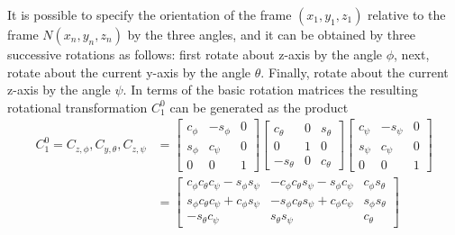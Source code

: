  It is possible to specify the orientation of the frame $(x_1,y_1,z_1)$ relative to the frame $N(x_n,y_n,z_n)$ by the three angles, and it can be obtained by three successive rotations as follows: first rotate about z-axis by the angle $\phi$, next, rotate about the current y-axis by the angle $\theta$. Finally, rotate about the current z-axis by the angle $\psi$.
 In terms of the basic rotation matrices the resulting rotational transformation $C_1^0$ can be generated as the product
 \begin{equation}\label{euler}
 \begin{split}
 C_1^0=C_{z,\phi},C_{y,\theta},C_{z,\psi} &= \left[\begin{array}{ccc}
                                                      c_\phi & -s_\phi & 0 \\
                                                      s_\phi & c_\psi & 0 \\
                                                      0 & 0 & 1 \end{array}\right]\left[\begin{array}{ccc}
                                                                                          c_\theta & 0 & s_\theta \\
                                                                                          0 & 1 & 0 \\
                                                                                          -s_\theta & 0 & c_\theta \end{array}\right]\left[\begin{array}{ccc}
                                                                                                                    c_\psi & -s_\psi & 0 \\
                                                                                                                    s_\psi & c_\psi & 0 \\
                                                                                                                     0& 0 & 1
                                                                                                                  \end{array}
                                                                                          \right]\\
                                                      &=\left[\begin{array}{ccc}
                                                        c_\phi c_\theta c_\psi-s_\phi s_\psi & -c_\phi c_\theta s_\psi-s_\phi c_\psi & c_\phi s_\theta \\
                                                        s_\phi c_\theta c_\psi+c_\phi s_\psi & -s_\phi c_\theta s_\psi+c_\phi c_\psi & s_\phi s_\theta \\
                                                        -s_\theta c_\psi & s_\theta s_\psi & c_\theta                     \end{array}\right]
 \end{split}
 \end{equation}

